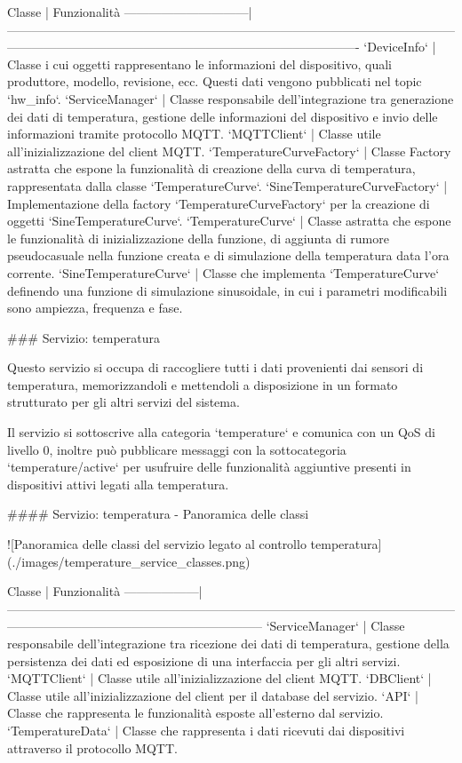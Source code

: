 Classe                        | Funzionalità
------------------------------|-------------------------------------------------------------------------------------------------------------------------------------------------------------------------------------------------
`DeviceInfo`                  | Classe i cui oggetti rappresentano le informazioni del dispositivo, quali produttore, modello, revisione, ecc. Questi dati vengono pubblicati nel topic `hw_info`.
`ServiceManager`              | Classe responsabile dell'integrazione tra generazione dei dati di temperatura, gestione delle informazioni del dispositivo e invio delle informazioni tramite protocollo MQTT.
`MQTTClient`                  | Classe utile all'inizializzazione del client MQTT.
`TemperatureCurveFactory`     | Classe Factory astratta che espone la funzionalità di creazione della curva di temperatura, rappresentata dalla classe `TemperatureCurve`.
`SineTemperatureCurveFactory` | Implementazione della factory `TemperatureCurveFactory` per la creazione di oggetti `SineTemperatureCurve`.
`TemperatureCurve`            | Classe astratta che espone le funzionalità di inizializzazione della funzione, di aggiunta di rumore pseudocasuale nella funzione creata e di simulazione della temperatura data l'ora corrente.
`SineTemperatureCurve`        | Classe che implementa `TemperatureCurve` definendo una funzione di simulazione sinusoidale, in cui i parametri modificabili sono ampiezza, frequenza e fase.

### Servizio: temperatura

Questo servizio si occupa di raccogliere tutti i dati provenienti dai sensori di temperatura, memorizzandoli e mettendoli a disposizione in un formato strutturato per gli altri servizi del sistema.

Il servizio si sottoscrive alla categoria `temperature` e comunica con un QoS di livello 0, inoltre può pubblicare messaggi con la sottocategoria `temperature/active` per usufruire delle funzionalità aggiuntive presenti in dispositivi attivi legati alla temperatura.

#### Servizio: temperatura - Panoramica delle classi

![Panoramica delle classi del servizio legato al controllo temperatura](./images/temperature_service_classes.png)

Classe            | Funzionalità
------------------|--------------------------------------------------------------------------------------------------------------------------------------------------------------------------
`ServiceManager`  | Classe responsabile dell'integrazione tra ricezione dei dati di temperatura, gestione della persistenza dei dati ed esposizione di una interfaccia per gli altri servizi.
`MQTTClient`      | Classe utile all'inizializzazione del client MQTT.
`DBClient`        | Classe utile all'inizializzazione del client per il database del servizio.
`API`             | Classe che rappresenta le funzionalità esposte all'esterno dal servizio.
`TemperatureData` | Classe che rappresenta i dati ricevuti dai dispositivi attraverso il protocollo MQTT.


